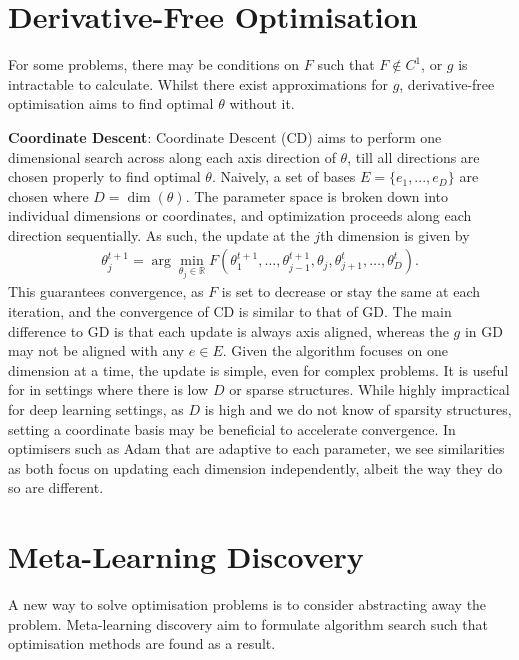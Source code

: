 \section{Derivative-Free Optimisation}
For some problems, there may be conditions on $F$ such that $F \notin C^1$, or $g$ is intractable to calculate. Whilst there exist approximations for $g$, derivative-free optimisation aims to find optimal $\theta$ without it.

\textbf{Coordinate Descent}: Coordinate Descent (CD) aims to perform one dimensional search across along each axis direction of $\theta$, till all directions are chosen properly to find optimal $\theta$. Naively, a set of bases $E = \{e_1, ..., e_D \}$ are chosen where $D = \dim(\theta)$. The parameter space is broken down into individual dimensions or coordinates, and optimization proceeds along each direction sequentially. As such, the update at the $j$th dimension is given by
\begin{align}
\theta^{t+1}_j = \arg\min_{\theta_j \in \mathbb{R}} F(\theta^{t+1}_1, \dots, \theta^{t+1}_{j-1}, \theta_j, \theta^t_{j+1}, \dots, \theta^t_D).
\end{align}
This guarantees convergence, as $F$ is set to decrease or stay the same at each iteration, and the convergence of CD is similar to that of GD. The main difference to GD is that each update is always axis aligned, whereas the $g$ in GD may not be aligned with any $e \in E$. Given the algorithm focuses on one dimension at a time, the update is simple, even for complex problems. It is useful for in settings where there is low $D$ or sparse structures. While highly impractical for deep learning settings, as $D$ is high and we do not know of sparsity structures, setting a coordinate basis may be beneficial to accelerate convergence. In optimisers such as Adam that are adaptive to each parameter, we see similarities as both focus on updating each dimension independently, albeit the way they do so are different. 


\section{Meta-Learning Discovery}
A new way to solve optimisation problems is to consider abstracting away the problem. Meta-learning discovery aim to formulate algorithm search such that optimisation methods are found as a result.

